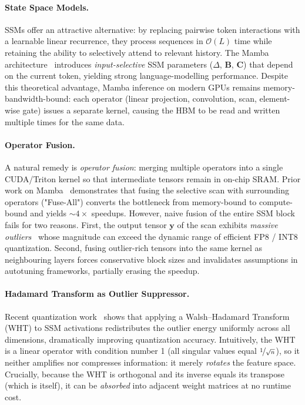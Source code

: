 \documentclass{article}
\newcommand{\vy}{\mathbf{y}}          %
\begin{document}
\paragraph{State Space Models.}
SSMs offer an attractive alternative: by replacing pairwise token interactions
with a learnable linear recurrence, they process sequences in $\mathcal{O}(L)$
time while retaining the ability to selectively attend to relevant history.
The Mamba architecture~\citep{gu2023mamba} introduces \emph{input-selective}
SSM parameters ($\Delta$, $\mathbf{B}$, $\mathbf{C}$) that depend on the
current token, yielding strong language-modelling performance.
Despite this theoretical advantage, Mamba inference on modern GPUs remains
memory-bandwidth-bound: each operator (linear projection, convolution, scan,
element-wise gate) issues a separate kernel, causing the HBM to be read and
written multiple times for the same data.

\paragraph{Operator Fusion.}
A natural remedy is \emph{operator fusion}: merging multiple operators into a
single CUDA/Triton kernel so that intermediate tensors remain in on-chip SRAM.
Prior work on Mamba~\citep{gu2023mamba,dao2024mamba2} demonstrates that
fusing the selective scan with surrounding operators ("Fuse-All") converts
the bottleneck from memory-bound to compute-bound and yields $\sim\!4\times$
speedups.  However, naive fusion of the entire SSM block fails for two
reasons.  First, the output tensor $\vy$ of the scan exhibits \emph{massive
outliers}~\citep{dettmers2022gpt3int8,sun2024massive} whose magnitude can
exceed the dynamic range of efficient FP8 / INT8 quantization.  Second, fusing
outlier-rich tensors into the same kernel as neighbouring layers forces
conservative block sizes and invalidates assumptions in autotuning frameworks,
partially erasing the speedup.

\paragraph{Hadamard Transform as Outlier Suppressor.}
Recent quantization work~\citep{liu2024quamba,zhu2024mambaquant} shows that
applying a Walsh–Hadamard Transform (WHT)
to SSM activations redistributes the outlier energy uniformly across all
dimensions, dramatically improving quantization accuracy.  Intuitively, the
WHT is a linear operator with condition number 1 (all singular values equal
$\nicefrac{1}{\sqrt{n}}$), so it neither amplifies nor compresses information:
it merely \emph{rotates} the feature space.  Crucially, because the WHT is
orthogonal and its inverse equals its transpose (which is itself), it can be
\emph{absorbed} into adjacent weight matrices at no runtime cost.
\end{document}
